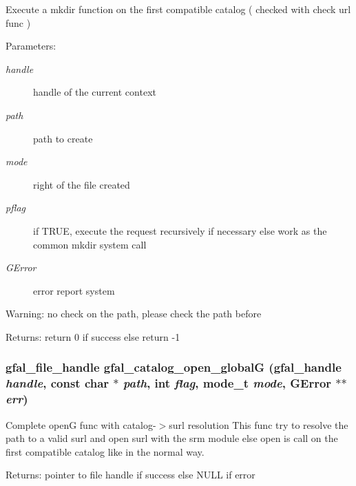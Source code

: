 Execute a mkdir function on the first compatible catalog ( checked with check url func ) \begin{Desc}
\item[Parameters:]
\begin{description}
\item[{\em handle}]handle of the current context \item[{\em path}]path to create \item[{\em mode}]right of the file created \item[{\em pflag}]if TRUE, execute the request recursively if necessary else work as the common mkdir system call \item[{\em GError}]error report system \end{description}
\end{Desc}
\begin{Desc}
\item[Warning:]no check on the path, please check the path before \end{Desc}
\begin{Desc}
\item[Returns:]return 0 if success else return -1 \end{Desc}
\subsubsection{\setlength{\rightskip}{0pt plus 5cm}gfal\_\-file\_\-handle gfal\_\-catalog\_\-open\_\-global\-G (gfal\_\-handle {\em handle}, const char $\ast$ {\em path}, int {\em flag}, mode\_\-t {\em mode}, GError $\ast$$\ast$ {\em err})}\label{gfal__common__catalog_8h_6698bf5c6d4e83f3734ac0793664894f}


Complete open\-G func with catalog-$>$surl resolution This func try to resolve the path to a valid surl and open surl with the srm module else open is call on the first compatible catalog like in the normal way. \begin{Desc}
\item[Returns:]pointer to file handle if success else NULL if error \end{Desc}
